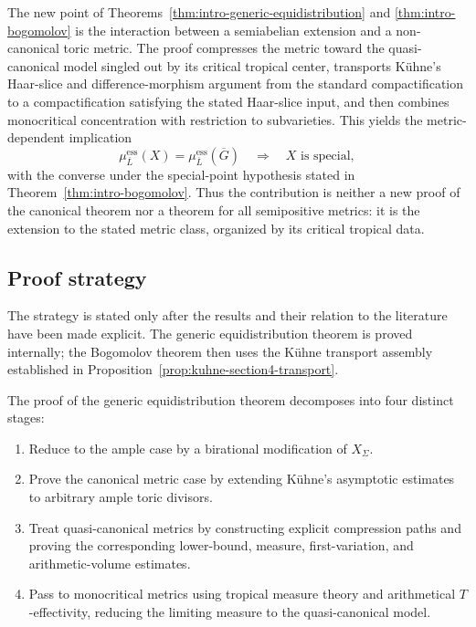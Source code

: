 \documentclass[10pt,a4paper]{amsart}
\theoremstyle{plain}
\theoremstyle{plain}
\numberwithin{equation}{section}
\begin{document}
The new point of Theorems~\ref{thm:intro-generic-equidistribution} and
\ref{thm:intro-bogomolov} is the interaction between a semiabelian extension
and a non-canonical toric metric.  The proof compresses the metric toward the
quasi-canonical model singled out by its critical tropical center, transports
K\"uhne's Haar-slice and difference-morphism argument from the standard
compactification to a compactification satisfying the stated Haar-slice input,
and
then combines monocritical concentration with restriction to subvarieties.
This yields the metric-dependent implication
\[
\mu^{\mathrm{ess}}_{\overline L}(X)
=\mu^{\mathrm{ess}}_{\overline L}(\overline G)
\quad\Longrightarrow\quad X\text{ is special},
\]
with the converse under the special-point hypothesis stated in
Theorem~\ref{thm:intro-bogomolov}.  Thus the contribution is neither a new
proof of the canonical theorem nor a theorem for all semipositive metrics: it
is the extension to the stated metric class, organized by its critical
tropical data.


\subsection*{Proof strategy}

The strategy is stated only after the results and their relation to the
literature have been made explicit.  The generic equidistribution theorem is
proved internally; the Bogomolov theorem then uses the K\"uhne transport
assembly established in Proposition~\ref{prop:kuhne-section4-transport}.

The proof of the generic equidistribution theorem decomposes into four
distinct stages:
\begin{enumerate}[label=\textup{(\arabic*)},leftmargin=2em]
	\item Reduce to the ample case by a birational modification of \(X_\Sigma\).
	\item Prove the canonical metric case by extending K\"uhne's asymptotic
	estimates to arbitrary ample toric divisors.
	\item Treat quasi-canonical metrics by constructing explicit compression paths
	and proving the corresponding lower-bound, measure, first-variation, and
	arithmetic-volume estimates.
	\item Pass to monocritical metrics using tropical measure theory and
	arithmetical \(T\)-effectivity, reducing the limiting measure to the
	quasi-canonical model.
\end{enumerate}
\end{document}
